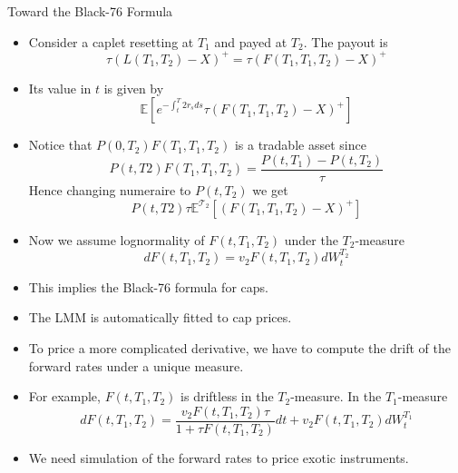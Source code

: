 \documentclass{beamer}
\begin{document}
\begin{frame}{Toward the Black-76 Formula}
\begin{itemize}
	\item Consider a caplet resetting at $T_1$ and payed at $T_2$. The payout is 
	\begin{equation}
		\tau(L(T_1,T_2)-X)^+ = \tau(F(T_1,T_1,T_2)-X)^+
	\end{equation}
\item Its value in $t$ is given by
	\begin{equation}
	\mathbb{E}\left[e^{-\int_t^T2r_s ds}\tau(F(T_1,T_1,T_2)-X)^+\right]
\end{equation}
\item Notice that $P(0,T_2)F(T_1,T_1,T_2)$ is a tradable asset since
\begin{equation}
P(t,T2)F(T_1,T_1,T_2)=\frac{P(t,T_1)-P(t,T_2)}{\tau}
\end{equation}
Hence changing numeraire to $P(t,T_2)$ we get
\begin{equation}
P(t,T2)\tau \mathbb{E}^{\mathcal{T_2}}\left[(F(T_1,T_1,T_2)-X)^+\right]
\end{equation}
\item Now we assume lognormality of $F(t,T_1,T_2)$ under the $T_2$-measure
\begin{equation}
dF(t,T_1,T_2)=v_2F(t,T_1,T_2) dW^{T_2}_t
\end{equation}
\end{itemize}
\end{frame}


\begin{frame}
\begin{itemize}
	\item This implies the Black-76 formula for caps.
	\item The LMM is automatically fitted to cap prices.
	\item To price a more complicated derivative, we have to compute the drift of the forward rates under a unique measure.
	\item For example, $F(t,T_1,T_2)$ is driftless in the $T_2$-measure. In the $T_1$-measure
	\begin{equation}
	dF(t,T_1,T_2)=\frac{v_2F(t,T_1,T_2)\tau}{1+\tau F(t,T_1,T_2)}dt + v_2F(t,T_1,T_2)dW^{T_1}_t
	\end{equation}
\item We need simulation of the forward rates to price exotic instruments.
\end{itemize}
\end{frame}
\end{document}
